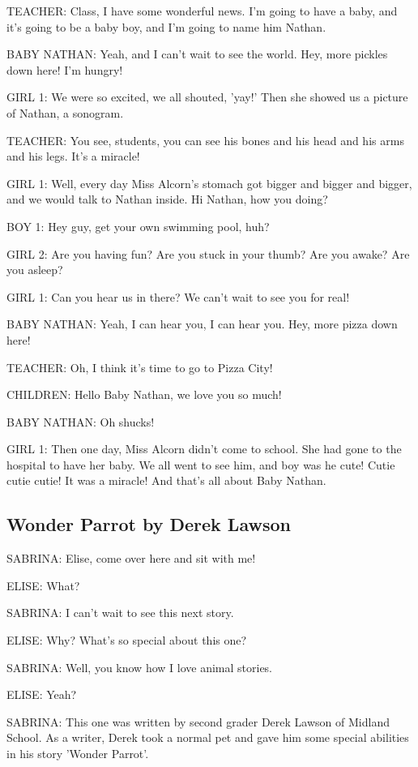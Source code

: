 TEACHER:
Class, I have some wonderful news.
I'm going to have a baby, and it's going to be a baby boy, and I'm going to name him Nathan.

BABY NATHAN:
Yeah, and I can't wait to see the world.
Hey, more pickles down here!
I'm hungry!

GIRL 1:
We were so excited, we all shouted, 'yay!'
Then she showed us a picture of Nathan, a sonogram.

TEACHER:
You see, students, you can see his bones and his head and his arms and his legs.
It's a miracle!

GIRL 1:
Well, every day Miss Alcorn's stomach got bigger and bigger and bigger, and we would talk to Nathan inside.
Hi Nathan, how you doing?

BOY 1:
Hey guy, get your own swimming pool, huh?

GIRL 2:
Are you having fun?
Are you stuck in your thumb?
Are you awake?
Are you asleep?

GIRL 1:
Can you hear us in there?
We can't wait to see you for real!

BABY NATHAN:
Yeah, I can hear you, I can hear you.
Hey, more pizza down here!

TEACHER:
Oh, I think it's time to go to Pizza City!

CHILDREN:
Hello Baby Nathan, we love you so much!

BABY NATHAN:
Oh shucks!

GIRL 1:
Then one day, Miss Alcorn didn't come to school.
She had gone to the hospital to have her baby.
We all went to see him, and boy was he cute!
Cutie cutie cutie!
It was a miracle!
And that's all about Baby Nathan.

\subsection{Wonder Parrot by Derek Lawson}

SABRINA:
Elise, come over here and sit with me!

ELISE:
What?

SABRINA:
I can't wait to see this next story.

ELISE:
Why?
What's so special about this one?

SABRINA:
Well, you know how I love animal stories.

ELISE:
Yeah?

SABRINA:
This one was written by second grader Derek Lawson of Midland School.
As a writer, Derek took a normal pet and gave him some special abilities in his story 'Wonder Parrot'.

